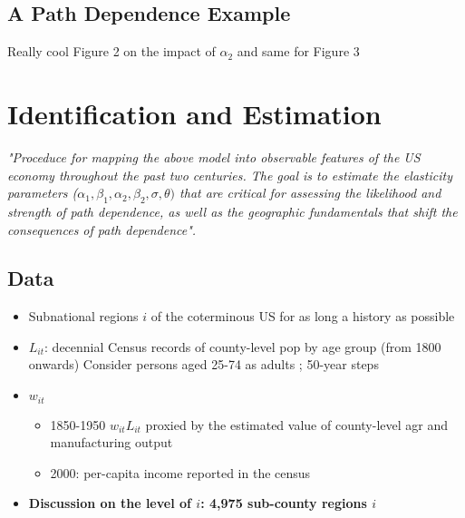 \documentclass[12pt, final]{article}
\begin{document}
\subsection{A Path Dependence Example} %
\label{sub:a_path_dependence_example}

Really cool Figure 2 on the impact of $\alpha_2$ and same for Figure 3







\section{Identification and Estimation} %
\label{sec:identification_and_estimation}

\textit{"Proceduce for mapping the above model into observable features of the US economy throughout the past two centuries. The goal is to estimate the elasticity parameters ($\alpha_1, \beta_1, \alpha_2, \beta_2, \sigma, \theta)$ that are critical for assessing the likelihood and strength of path dependence, as well as the geographic fundamentals that shift the consequences of path dependence".}

\subsection{Data} %
\label{sub:data}
\begin{itemize}
    \item Subnational regions $i$ of the coterminous US for as long a history as possible
    \item $L_{it}$: decennial Census records of county-level pop by age group (from 1800 onwards) Consider persons aged 25-74 as adults ; 50-year steps
    \item $w_{it}$
    \begin{itemize}
        \item 1850-1950 $w_{it} L_{it}$ proxied by the estimated value of county-level agr and manufacturing output
        \item 2000: per-capita income reported in the census
    \end{itemize}
    \item \textbf{Discussion on the level of $i$: 4,975 sub-county regions $i$}
\end{itemize}
\end{document}
